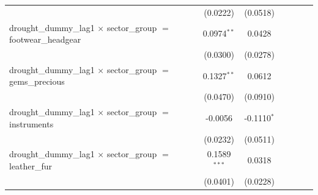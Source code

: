 \begin{tabular}{lcccccccc}
                                                                                  &                       &                       & (0.0222)              & (0.0518)              &                       &                       &                       &   \\   
   drought\_dummy\_lag1 $\times$ sector\_group $=$ footwear\_headgear             &                       &                       & 0.0974$^{**}$         & 0.0428                &                       &                       &                       &   \\   
                                                                                  &                       &                       & (0.0300)              & (0.0278)              &                       &                       &                       &   \\   
   drought\_dummy\_lag1 $\times$ sector\_group $=$ gems\_precious                 &                       &                       & 0.1327$^{**}$         & 0.0612                &                       &                       &                       &   \\   
                                                                                  &                       &                       & (0.0470)              & (0.0910)              &                       &                       &                       &   \\   
   drought\_dummy\_lag1 $\times$ sector\_group $=$ instruments                    &                       &                       & -0.0056               & -0.1110$^{*}$         &                       &                       &                       &   \\   
                                                                                  &                       &                       & (0.0232)              & (0.0511)              &                       &                       &                       &   \\   
   drought\_dummy\_lag1 $\times$ sector\_group $=$ leather\_fur                   &                       &                       & 0.1589$^{***}$        & 0.0318                &                       &                       &                       &   \\   
                                                                                  &                       &                       & (0.0401)              & (0.0228)              &                       &                       &                       &   \\   

\end{tabular}
